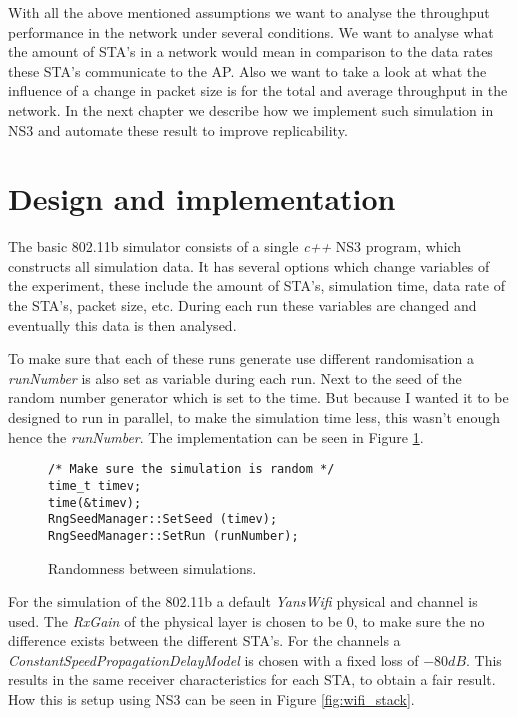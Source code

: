 \documentclass[]{article}
\begin{document}
With all the above mentioned assumptions we want to analyse the throughput performance in the network under several conditions.
We want to analyse what the amount of STA's in a network would mean in comparison to the data rates these STA's communicate to the AP.
Also we want to take a look at what the influence of a change in packet size is for the total and average throughput in the network.
In the next chapter we describe how we implement such simulation in NS3 and automate these result to improve replicability.

\newpage
\section{Design and implementation}
The basic 802.11b simulator consists of a single \textit{c++} NS3 program, which constructs all simulation data.
It has several options which change variables of the experiment, these include the amount of STA's, simulation time, data rate of the STA's, packet size, etc.
During each run these variables are changed and eventually this data is then analysed.

To make sure that each of these runs generate use different randomisation a \textit{runNumber} is also set as variable during each run.
Next to the seed of the random number generator which is set to the time.
But because I wanted it to be designed to run in parallel, to make the simulation time less, this wasn't enough hence the \textit{runNumber}.
The implementation can be seen in Figure \ref{fig:random}.

\begin{figure}[H]
\begin{lstlisting}[frame=bt]
/* Make sure the simulation is random */
time_t timev;
time(&timev);
RngSeedManager::SetSeed (timev);
RngSeedManager::SetRun (runNumber);
\end{lstlisting}
\caption{Randomness between simulations.\label{fig:random}}
\end{figure}

For the simulation of the 802.11b a default \textit{YansWifi} physical and channel is used.
The \textit{RxGain} of the physical layer is chosen to be $0$, to make sure the no difference exists between the different STA's.
For the channels a \textit{ConstantSpeedPropagationDelayModel} is chosen with a fixed loss of $-80dB$.
This results in the same receiver characteristics for each STA, to obtain a fair result.
How this is setup using NS3 can be seen in Figure \ref{fig:wifi_stack}.
\end{document}
